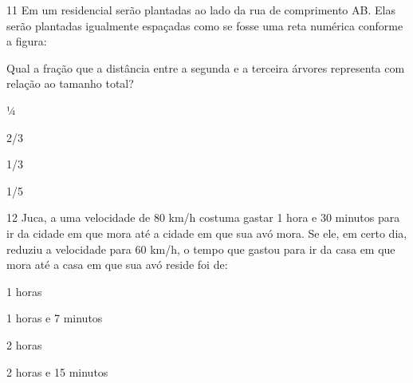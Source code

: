 {\num{11} Em um residencial serão plantadas ao lado da rua de comprimento
AB. Elas serão plantadas igualmente espaçadas como se fosse uma reta
numérica conforme a figura:


Qual a fração que a distância entre a segunda e a terceira árvores
representa com relação ao tamanho total?

\begin{escolha}
\item
  ¼
\item
  2/3
\item
  1/3
\item
  1/5
\end{escolha}


\num{12} Juca, a uma velocidade de 80 km/h costuma gastar 1 hora e 30
minutos para ir da cidade em que mora até a cidade em que sua avó mora.
Se ele, em certo dia, reduziu a velocidade para 60 km/h, o tempo que
gastou para ir da casa em que mora até a casa em que sua avó reside foi
de:

\begin{escolha}
\item
  1 horas
\item
  1 horas e 7 minutos
\item
  2 horas
\item
  2 horas e 15 minutos
\end{escolha}


}
